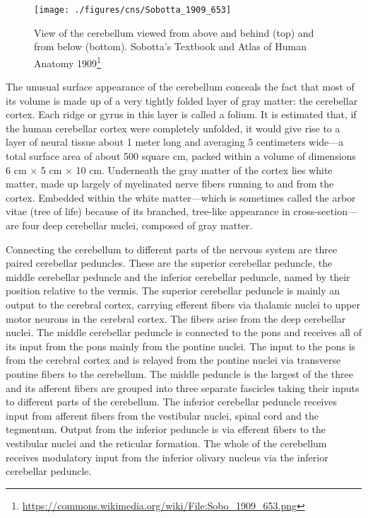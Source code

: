\documentclass[]{book}
\let\rmarkdownfootnote\footnote%
\def\footnote{\protect\rmarkdownfootnote}
\renewcommand{\href}[2]{#2\footnote{\url{#1}}}
\begin{document}
\begin{figure}

{\centering \texttt{[image: ./figures/cns/Sobotta\_1909\_653]} 

}

\caption{View of the cerebellum viewed from above and behind (top) and from below (bottom). \href{https://commons.wikimedia.org/wiki/File:Sobo_1909_653.png}{Sobotta's Textbook and Atlas of Human Anatomy 1909}}\label{fig:cerebellumabovebelow}
\end{figure}

The unusual surface appearance of the cerebellum conceals the fact that most of its volume is made up of a very tightly folded layer of gray matter: the cerebellar cortex. Each ridge or gyrus in this layer is called a folium. It is estimated that, if the human cerebellar cortex were completely unfolded, it would give rise to a layer of neural tissue about 1 meter long and averaging 5 centimeters wide---a total surface area of about 500 square cm, packed within a volume of dimensions 6 cm × 5 cm × 10 cm. Underneath the gray matter of the cortex lies white matter, made up largely of myelinated nerve fibers running to and from the cortex. Embedded within the white matter---which is sometimes called the arbor vitae (tree of life) because of its branched, tree-like appearance in cross-section---are four deep cerebellar nuclei, composed of gray matter.

Connecting the cerebellum to different parts of the nervous system are three paired cerebellar peduncles. These are the superior cerebellar peduncle, the middle cerebellar peduncle and the inferior cerebellar peduncle, named by their position relative to the vermis. The superior cerebellar peduncle is mainly an output to the cerebral cortex, carrying efferent fibers via thalamic nuclei to upper motor neurons in the cerebral cortex. The fibers arise from the deep cerebellar nuclei. The middle cerebellar peduncle is connected to the pons and receives all of its input from the pons mainly from the pontine nuclei. The input to the pons is from the cerebral cortex and is relayed from the pontine nuclei via transverse pontine fibers to the cerebellum. The middle peduncle is the largest of the three and its afferent fibers are grouped into three separate fascicles taking their inputs to different parts of the cerebellum. The inferior cerebellar peduncle receives input from afferent fibers from the vestibular nuclei, spinal cord and the tegmentum. Output from the inferior peduncle is via efferent fibers to the vestibular nuclei and the reticular formation. The whole of the cerebellum receives modulatory input from the inferior olivary nucleus via the inferior cerebellar peduncle.
\end{document}
